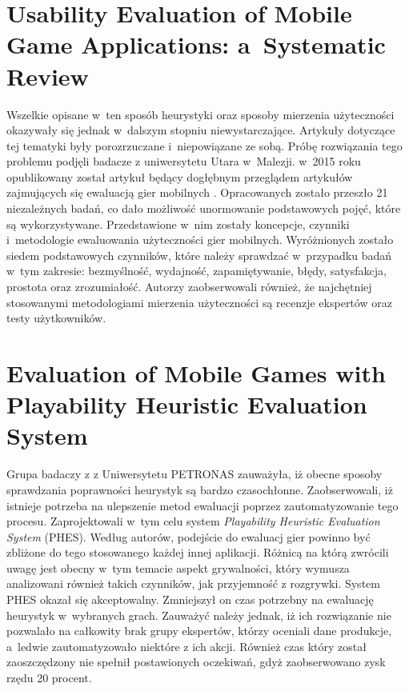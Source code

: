 \documentclass[a4paper,12pt,numbers=noenddot]{report}
\begin{document}
\section{Usability Evaluation of Mobile Game Applications: a~Systematic Review}
Wszelkie opisane w~ten sposób heurystyki oraz sposoby mierzenia użyteczności okazywały się jednak w~dalszym stopniu niewystarczające. Artykuły dotyczące tej tematyki były porozrzuczane i~niepowiązane ze sobą. Próbę rozwiązania tego problemu podjęli badacze z uniwersytetu Utara w~Malezji. w~2015 roku opublikowany został artykuł będący dogłębnym przeglądem artykułów zajmujących się ewaluacją gier mobilnych \cite{art_UsabilityEvaluationSystematicReview}. Opracowanych zostało przeszło 21 niezależnych badań, co dało możliwość unormowanie podstawowych pojęć, które są wykorzystywane. Przedstawione w~nim zostały koncepcje, czynniki i~metodologie ewaluowania użyteczności gier mobilnych. Wyróżnionych zostało siedem podstawowych czynników, które należy sprawdzać w~przypadku badań w~tym zakresie: bezmyślność, wydajność, zapamiętywanie, błędy, satysfakcja, prostota oraz zrozumiałość. Autorzy zaobserwowali również, że najchętniej stosowanymi metodologiami mierzenia użyteczności są recenzje ekspertów oraz testy użytkowników.

\section{Evaluation of Mobile Games with Playability Heuristic Evaluation System}
Grupa badaczy z z Uniwersytetu PETRONAS zauważyła, iż obecne sposoby sprawdzania poprawności heurystyk są bardzo czasochłonne. \cite{art_evaluationOfMGevaluationSystem} Zaobserwowali, iż istnieje potrzeba na ulepszenie metod ewaluacji poprzez zautomatyzowanie tego procesu. Zaprojektowali w~tym celu system \textit{Playability Heuristic Evaluation System} (PHES). Według autorów, podejście do ewaluacj gier powinno być zbliżone do tego stosowanego każdej innej aplikacji. Różnicą na którą zwrócili uwagę jest obecny w~tym temacie aspekt grywalności, który wymusza analizowani również takich czynników, jak przyjemność z rozgrywki. System PHES okazał się akceptowalny. Zmniejszył on czas potrzebny na ewaluację heurystyk w~wybranych grach. Zauważyć należy jednak, iż ich rozwiązanie nie pozwalało na całkowity brak grupy ekspertów, którzy oceniali dane produkcje, a~ledwie zautomatyzowało niektóre z ich akcji. Również czas który został zaoszczędzony nie spełnił postawionych oczekiwań, gdyż zaobserwowano zysk rzędu 20 procent.
\end{document}
